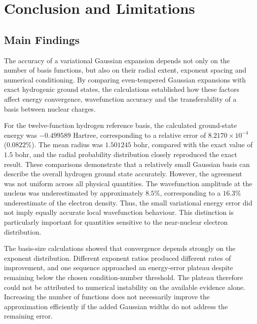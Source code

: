 

\chapter{Conclusion and Limitations}
\label{chap:conclusion}



\section{Main Findings}

The accuracy of a variational Gaussian expansion depends not only on the number of basis functions, but also on their radial extent, exponent spacing and numerical conditioning. By comparing even-tempered Gaussian expansions with exact hydrogenic ground states, the calculations established how these factors affect energy convergence, wavefunction accuracy and the transferability of a basis between nuclear charges.

For the twelve-function hydrogen reference basis, the calculated ground-state energy was $-0.499589$ Hartree, corresponding to a relative error of $8.2170\times10^{-4}$ ($0.0822\%$). The mean radius was $1.501245$ bohr, compared with the exact value of $1.5$ bohr, and the radial probability distribution closely reproduced the exact result. These comparisons demonstrate that a relatively small Gaussian basis can describe the overall hydrogen ground state accurately. However, the agreement was not uniform across all physical quantities. The wavefunction amplitude at the nucleus was underestimated by approximately $8.5\%$, corresponding to a $16.3\%$ underestimate of the electron density. Thus, the small variational energy error did not imply equally accurate local wavefunction behaviour. This distinction is particularly important for quantities sensitive to the near-nuclear electron distribution.

The basis-size calculations showed that convergence depends strongly on the exponent distribution. Different exponent ratios produced different rates of improvement, and one sequence approached an energy-error plateau despite remaining below the chosen condition-number threshold. The plateau therefore could not be attributed to numerical instability on the available evidence alone. Increasing the number of functions does not necessarily improve the approximation efficiently if the added Gaussian widths do not address the remaining error.


